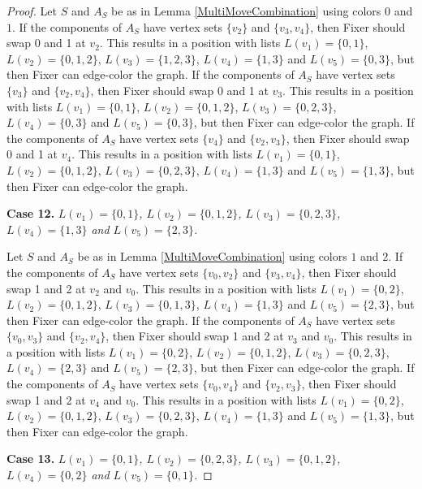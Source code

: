 \documentclass[12pt]{amsart}
\theoremstyle{plain}
\theoremstyle{definition}
\theoremstyle{remark}
\begin{document}
\begin{proof}
Let $S$ and $A_S$ be as in Lemma \ref{MultiMoveCombination} using colors $0$ and $1$. If the components of $A_S$ have vertex sets $\{v_2\}$ and $\{v_3, v_4\}$, then Fixer should swap 0 and 1 at $v_2$. This results in a position with lists $L(v_1) = \{0, 1\}$, $L(v_2) = \{0, 1, 2\}$, $L(v_3) = \{1, 2, 3\}$, $L(v_4) = \{1, 3\}$ and $L(v_5) = \{0, 3\}$, but then Fixer can edge-color the graph.
If the components of $A_S$ have vertex sets $\{v_3\}$ and $\{v_2, v_4\}$, then Fixer should swap 0 and 1 at $v_3$. This results in a position with lists $L(v_1) = \{0, 1\}$, $L(v_2) = \{0, 1, 2\}$, $L(v_3) = \{0, 2, 3\}$, $L(v_4) = \{0, 3\}$ and $L(v_5) = \{0, 3\}$, but then Fixer can edge-color the graph.
If the components of $A_S$ have vertex sets $\{v_4\}$ and $\{v_2, v_3\}$, then Fixer should swap 0 and 1 at $v_4$. This results in a position with lists $L(v_1) = \{0, 1\}$, $L(v_2) = \{0, 1, 2\}$, $L(v_3) = \{0, 2, 3\}$, $L(v_4) = \{1, 3\}$ and $L(v_5) = \{1, 3\}$, but then Fixer can edge-color the graph.

\noindent\textbf{Case 12.  }\textit{$L(v_1) = \{0, 1\}$, $L(v_2) = \{0, 1, 2\}$, $L(v_3) = \{0, 2, 3\}$, $L(v_4) = \{1, 3\}$ and $L(v_5) = \{2, 3\}$.}

Let $S$ and $A_S$ be as in Lemma \ref{MultiMoveCombination} using colors $1$ and $2$. If the components of $A_S$ have vertex sets $\{v_0, v_2\}$ and $\{v_3, v_4\}$, then Fixer should swap 1 and 2 at $v_2$ and $v_0$. This results in a position with lists $L(v_1) = \{0, 2\}$, $L(v_2) = \{0, 1, 2\}$, $L(v_3) = \{0, 1, 3\}$, $L(v_4) = \{1, 3\}$ and $L(v_5) = \{2, 3\}$, but then Fixer can edge-color the graph.
If the components of $A_S$ have vertex sets $\{v_0, v_3\}$ and $\{v_2, v_4\}$, then Fixer should swap 1 and 2 at $v_3$ and $v_0$. This results in a position with lists $L(v_1) = \{0, 2\}$, $L(v_2) = \{0, 1, 2\}$, $L(v_3) = \{0, 2, 3\}$, $L(v_4) = \{2, 3\}$ and $L(v_5) = \{2, 3\}$, but then Fixer can edge-color the graph.
If the components of $A_S$ have vertex sets $\{v_0, v_4\}$ and $\{v_2, v_3\}$, then Fixer should swap 1 and 2 at $v_4$ and $v_0$. This results in a position with lists $L(v_1) = \{0, 2\}$, $L(v_2) = \{0, 1, 2\}$, $L(v_3) = \{0, 2, 3\}$, $L(v_4) = \{1, 3\}$ and $L(v_5) = \{1, 3\}$, but then Fixer can edge-color the graph.

\noindent\textbf{Case 13.  }\textit{$L(v_1) = \{0, 1\}$, $L(v_2) = \{0, 2, 3\}$, $L(v_3) = \{0, 1, 2\}$, $L(v_4) = \{0, 2\}$ and $L(v_5) = \{0, 1\}$.}


\end{proof}
\end{document}
